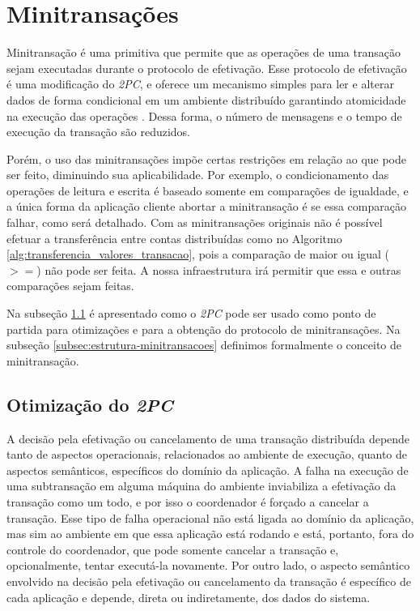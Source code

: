 \documentclass[11pt,twoside,a4paper]{book}
\begin{document}
\section{Minitransações}
\label{sec:minitransacoes}
Minitransação é uma primitiva que permite que as operações de uma transação sejam executadas durante o protocolo de efetivação. Esse protocolo de efetivação é uma modificação do \emph{2PC}, e oferece um mecanismo simples para ler e alterar dados de forma condicional em um ambiente distribuído garantindo atomicidade na execução das operações \cite{sinfonia}. Dessa forma, o número de mensagens e o tempo de execução da transação são reduzidos. 

Porém, o uso das minitransações impõe certas restrições em relação ao que pode ser feito, diminuindo sua aplicabilidade. Por exemplo, o condicionamento das operações de leitura e escrita é baseado somente em comparações de igualdade, e a única forma da aplicação cliente abortar a minitransação é se essa comparação falhar, como será detalhado. Com as minitransações originais não é possível efetuar a transferência entre contas distribuídas como no Algoritmo \ref{alg:transferencia_valores_transacao}, pois a comparação de maior ou igual ($>=$) não pode ser feita. A nossa infraestrutura irá permitir que essa e outras comparações sejam feitas.

Na subseção \ref{subsec:derivando-minitransacoes} é apresentado como o
\emph{2PC} pode ser usado como ponto de partida para otimizações e para a
obtenção do protocolo de minitransações. Na subseção
\ref{subsec:estrutura-minitransacoes} definimos formalmente o conceito de minitransação.

\subsection{Otimização do \emph{2PC}}
\label{subsec:derivando-minitransacoes}
A decisão pela efetivação ou cancelamento de uma transação distribuída depende tanto de aspectos operacionais, relacionados ao ambiente de execução, quanto de aspectos semânticos, específicos do domínio da aplicação. A falha na execução de uma subtransação em alguma máquina do ambiente inviabiliza a efetivação da transação como um todo, e por isso o coordenador é forçado a cancelar a transação. Esse tipo de falha operacional não está ligada ao domínio da aplicação, mas sim ao ambiente em que essa aplicação está rodando e está, portanto, fora do controle do coordenador, que pode somente cancelar a transação e, opcionalmente, tentar executá-la novamente. Por outro lado, o aspecto semântico envolvido na decisão pela efetivação ou cancelamento da transação é específico de cada aplicação e depende, direta ou indiretamente, dos dados do sistema.
\end{document}
